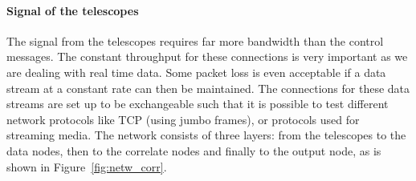 \paragraph{Signal of the telescopes}
The signal from the telescopes requires far more bandwidth than the
control messages. The constant throughput for these connections is
very important as we are dealing with real time data. Some packet loss
is even acceptable if a data stream at a constant rate can then be
maintained. The connections for these data streams are set up to be
exchangeable such that it is possible to test different network
protocols like TCP (using jumbo frames), or protocols used for
streaming media. The network consists of three layers: from the
telescopes to the data nodes, then to the correlate nodes and finally
to the output node, as is shown in Figure~\ref{fig:netw_corr}.


